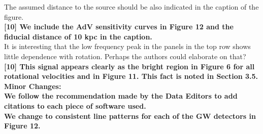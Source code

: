 \documentclass[11pt]{article}
\begin{document}
The assumed distance to the source should be also indicated in the caption of the 
figure.\\

\textbf{[10] We include the AdV sensitivity curves in Figure 12 and the fiducial distance of 10 kpc in the caption.}\\

It is interesting that the low frequency peak in the panels in the top row shows 
little dependence with rotation. Perhaps the authors could elaborate on that?\\

\textbf{[10] This signal appears clearly as the bright region in Figure 6 for all rotational velocities and in Figure 11.  This fact is noted in Section 3.5.}\\

\textbf{Minor Changes:}\\

\textbf{We follow the recommendation made by the Data Editors to add citations to each piece of software used.}\\

\textbf{We change to consistent line patterns for each of the GW detectors in Figure 12.}



% 
%
% 
%
% 

\newpage

\setcounter{page}{1}  \renewcommand{\thepage}
           {Bibliography -- \arabic{page}}

\renewcommand\bibsection{\section*{References}}
\setlength{\bibsep}{2pt}

\end{document}
